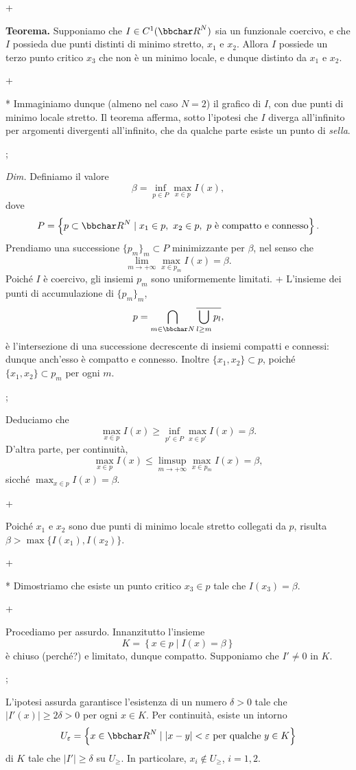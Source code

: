 \pg+

{\bf Teorema.} Supponiamo che $I \in C^1(\R^N)$ sia un funzionale
coercivo, e che $I$ possieda due punti distinti di minimo stretto,
$x_1$ e $x_2$. Allora $I$ possiede un terzo punto critico $x_3$ che
non \`e un minimo locale, e dunque distinto da $x_1$ e $x_2$.

\pg+

* Immaginiamo dunque (almeno nel caso $N=2$) il grafico di $I$, con
  due punti di minimo locale stretto. Il teorema afferma, sotto
  l'ipotesi che $I$ diverga all'infinito per argomenti divergenti
  all'infinito, che da qualche parte esiste un punto di {\em sella}.

\pg;

{\em Dim.} Definiamo il valore
$$
\beta = \inf_{p \in P} \max_{x \in p} I(x),
$$
dove
$$
P = \left\{ p \subset \R^N \mid x_1 \in p,\ x_2 \in p, \ \hbox{$p$ \`e
compatto e connesso} \right\}.
$$
Prendiamo una successione $\{p_m\}_m \subset P$ minimizzante per $\beta$, nel
senso che
$$
\lim_{m \to +\infty} \max_{x\in p_m} I(x) = \beta.
$$
Poich\'e $I$ \`e coercivo, gli insiemi $p_m$ sono uniformemente
limitati.
\pg+
L'insieme dei punti di accumulazione di $\{p_m\}_m$,
$$
p = \bigcap_{m \in {\bbchar N}} \overline{\bigcup_{l \geq m} p_l},
$$
\`e l'intersezione di una successione decrescente di insiemi compatti
e connessi: dunque anch'esso \`e compatto e connesso. Inoltre
$\{x_1,x_2\} \subset p$, poich\'e $\{x_1,x_2\} \subset p_m$ per ogni
$m$.

\pg;

Deduciamo che
$$
\max_{x \in p} I(x) \geq \inf_{p'\in P} \max_{x \in p'} I(x) = \beta.
$$
D'altra parte, per continuit\`a,
$$
\max_{x \in p} I(x) \leq \limsup_{m \to+\infty} \max_{x \in p_m} I(x)
= \beta,
$$
sicch\'e $\max_{x \in p} I(x) = \beta$.

\pg+

Poich\'e $x_1$ e $x_2$ sono due punti di minimo locale stretto
collegati da $p$, risulta $\beta > \max \{ I(x_1),I(x_2)\}$.

\pg+

* Dimostriamo che esiste un punto critico $x_3 \in p$ tale che
  $I(x_3)=\beta$.

\pg+

Procediamo per assurdo. Innanzitutto l'insieme
$$
K = \left\{ x \in p \mid I(x)=\beta \right\}
$$
\`e chiuso (perch\'e?) e limitato, dunque compatto. Supponiamo che $I'
\neq 0$ in $K$.

\pg;

L'ipotesi assurda garantisce l'esistenza di un numero $\delta>0$ tale
che $|I'(x) | \geq 2\delta>0$ per ogni $x \in K$. Per continuit\`a,
esiste un intorno
$$
U_\ge = \left\{ x \in \R^N \mid |x-y| < \ge \ \hbox{per qualche $y \in
K$} \right\}
$$
di $K$ tale che $|I'| \geq \delta$ su $U_\ge$. In particolare, $x_i
\notin U_\ge$, $i=1,2$.


